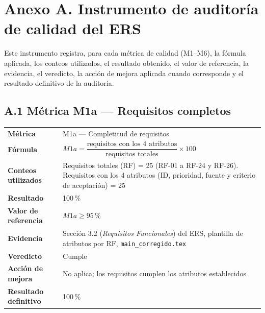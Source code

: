 
\section*{Anexo A. Instrumento de auditoría de calidad del ERS}

Este instrumento registra, para cada métrica de calidad (M1--M6),
la fórmula aplicada, los conteos utilizados, el resultado obtenido,
el valor de referencia, la evidencia, el veredicto, la acción de
mejora aplicada cuando corresponde y el resultado definitivo de la
auditoría.

\subsection*{A.1 Métrica M1a — Requisitos completos}

\begin{tabular}{p{3.2cm}p{9.5cm}}
\hline
\textbf{Métrica} & M1a — Completitud de requisitos \\

\textbf{Fórmula} &
$M1a =
\dfrac{\text{requisitos con los 4 atributos}}
{\text{requisitos totales}}\times100$ \\

\textbf{Conteos utilizados} &
Requisitos totales (RF) = 25 (RF-01 a RF-24 y RF-26). \newline
Requisitos con los 4 atributos (ID, prioridad, fuente y criterio de aceptación) = 25 \\

\textbf{Resultado} & 100\,\% \\

\textbf{Valor de referencia} & $M1a \geq 95\,\%$ \\

\textbf{Evidencia} &
Sección 3.2 (\emph{Requisitos Funcionales}) del ERS, plantilla de
atributos por RF, \texttt{main\_corregido.tex} \\

\textbf{Veredicto} & Cumple \\

\textbf{Acción de mejora} &
No aplica; los requisitos cumplen los atributos establecidos \\

\textbf{Resultado definitivo} & 100\,\% \\

\hline
\end{tabular}

